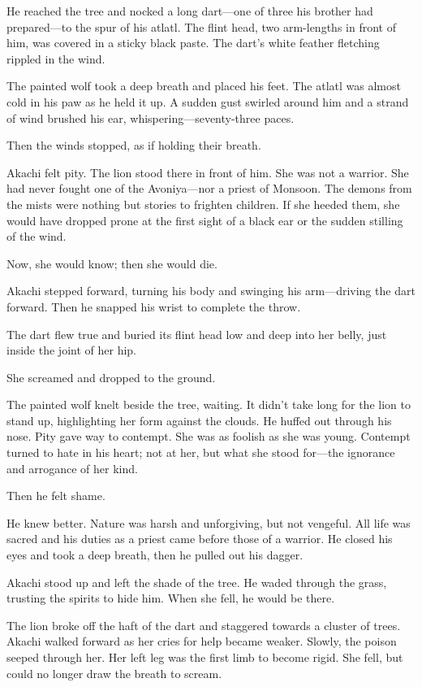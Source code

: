He reached the tree and nocked a long dart---one of three his brother had prepared---to the spur of his atlatl. The flint head, two arm-lengths in front of him, was covered in a sticky black paste. The dart's white feather fletching rippled in the wind.

The painted wolf took a deep breath and placed his feet. The atlatl was almost cold in his paw as he held it up. A sudden gust swirled around him and a strand of wind brushed his ear, whispering---seventy-three paces.

Then the winds stopped, as if holding their breath.

Akachi felt pity. The lion stood there in front of him. She was not a warrior. She had never fought one of the Avoniya---nor a priest of Monsoon. The demons from the mists were nothing but stories to frighten children. If she heeded them, she would have dropped prone at the first sight of a black ear or the sudden stilling of the wind.

Now, she would know; then she would die.

Akachi stepped forward, turning his body and swinging his arm---driving the dart forward. Then he snapped his wrist to complete the throw.

The dart flew true and buried its flint head low and deep into her belly, just inside the joint of her hip. 

 She screamed and dropped to the ground.

The painted wolf knelt beside the tree, waiting. It didn't take long for the lion to stand up, highlighting her form against the clouds. He huffed out through his nose. Pity gave way to contempt. She was as foolish as she was young. Contempt turned to hate in his heart; not at her, but what she stood for---the ignorance and arrogance of her kind.

Then he felt shame.

He knew better. Nature was harsh and unforgiving, but not vengeful. All life was sacred and his duties as a priest came before those of a warrior. He closed his eyes and took a deep breath, then he pulled out his dagger.

Akachi stood up and left the shade of the tree. He waded through the grass, trusting the spirits to hide him. When she fell, he would be there.

The lion broke off the haft of the dart and staggered towards a cluster of trees. Akachi walked forward as her cries for help became weaker. Slowly, the poison seeped through her. Her left leg was the first limb to become rigid. She fell, but could no longer draw the breath to scream.

